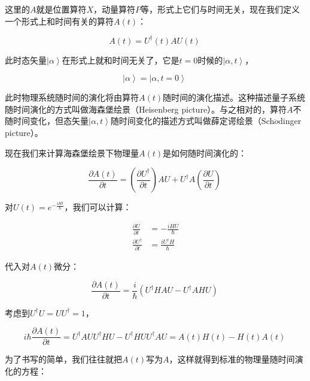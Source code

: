 这里的$A$就是位置算符$X$，动量算符$P$等，形式上它们与时间无关，现在我们定义一个形式上和时间有关的算符$A(t)$：

\begin{equation}
A(t) = U^\dagger (t ) A U(t)~
\end{equation}

此时态矢量$\left| \alpha \right\rangle$在形式上就和时间无关了，它是$t=0$时候的$\left| \alpha, t \right\rangle$，

\begin{equation}
\left| \alpha \right\rangle = \left| \alpha, t = 0 \right\rangle~
\end{equation}

此时物理系统随时间的演化将由算符$A(t)$随时间的演化描述。这种描述量子系统随时间演化的方式叫做海森堡绘景（Heisenberg picture）。与之相对的，算符$A$不随时间变化，但态矢量$\left| \alpha, t \right\rangle $随时间变化的描述方式叫做薛定谔绘景（Sch$\ddot o$dinger picture）。

现在我们来计算海森堡绘景下物理量$A(t)$是如何随时间演化的：

\begin{equation}
\frac{\partial A(t) }{\partial t }  = \left( \frac{ \partial U^\dagger }{\partial t } \right) A U + U^\dagger A \left( \frac{ \partial U }{\partial t } \right)~
\end{equation}

对$U(t) = e^{- \frac{i H t}{\hbar}}$，我们可以计算：

\begin{align}
\frac{\partial U }{\partial t } &= - \frac{i H U}{\hbar}  \\
\frac{\partial U^\dagger }{\partial t } &= \frac{i U^\dagger H }{\hbar}~
\end{align}

代入对$A(t)$微分：

\begin{equation}
\frac{\partial A(t) }{\partial t } = \frac{i}{\hbar} \left( U^\dagger H AU - U^\dagger A H U \right)~
\end{equation}

考虑到$U^\dagger U = U U^\dagger  = 1$，

\begin{equation}
i \hbar \frac{\partial A(t) }{\partial t }  = U^\dagger A U U^\dagger H U - U^\dagger H U U^\dagger A U = A(t)H(t) - H(t)A(t)~
\end{equation}

为了书写的简单，我们往往就把$A(t)$写为$A$，这样就得到标准的物理量随时间演化的方程：

